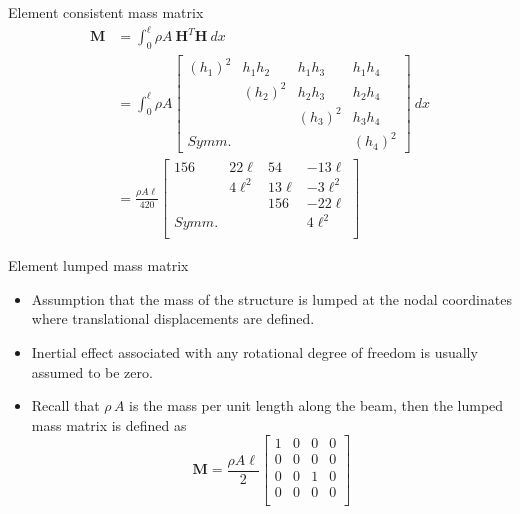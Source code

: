 \documentclass[aspectratio=169]{beamer}
\begin{document}
{\begin{frame}{Element consistent mass matrix}
  \begin{align*}
    \mathbf{M} & =\int_0^{\ell}  \rho A\ \mathbf{H}^T\mathbf{H}\ dx                                                                                           \\
               & =\int_0^{\ell} \rho A \begin{bmatrix} (h_1)^2 & h_1 h_2 & h_1 h_3 & h_1 h_4 \\
                        & (h_2)^2 & h_2 h_3 & h_2 h_4 \\ & & (h_3)^2                & h_3 h_4 \\ Symm. & & & (h_4)^2\end{bmatrix} \ dx \\[5pt]
               & =\frac{\rho A\ell }{420}\begin{bmatrix}
                                           156   & 22\ell  & 54     & -13\ell  \\
                                                 & 4\ell^2 & 13\ell & -3\ell^2 \\
                                                 &         & 156    & -22\ell  \\
                                           Symm. &         &        & 4\ell^2  \\
                                         \end{bmatrix}
  \end{align*}
\end{frame}

\begin{frame}{Element lumped mass matrix}
  \begin{itemize}
    \item Assumption that the mass of the structure is lumped at the nodal coordinates where translational displacements are defined.
    \item Inertial effect associated with any rotational degree of freedom is usually assumed to be zero.
    \item Recall that $\rho\, A$ is the mass per unit length along the beam, then the lumped mass matrix is defined as
          \vspace{0.3cm}
          $$\mathbf{M}=\frac{\rho A\ell}{2}\begin{bmatrix}
              1 & 0 & 0 & 0 \\
              0 & 0 & 0 & 0 \\
              0 & 0 & 1 & 0 \\
              0 & 0 & 0 & 0 \\
            \end{bmatrix}$$
  \end{itemize}
\end{frame}
}
\end{document}
